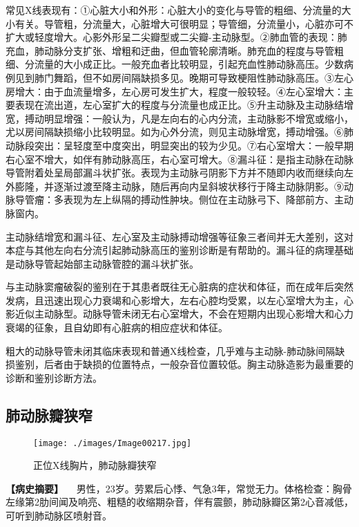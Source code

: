 常见X线表现有：①心脏大小和外形：心脏大小的变化与导管的粗细、分流量的大小有关。导管粗，分流量大，心脏增大可很明显；导管细，分流量小，心脏亦可不扩大或轻度增大。心影外形呈二尖瓣型或二尖瓣-主动脉型。②肺血管的表现：肺充血，肺动脉分支扩张、增粗和迂曲，但血管轮廓清晰。肺充血的程度与导管粗细、分流量的大小成正比。一般充血者比较明显，引起充血性肺动脉高压。少数病例见到肺门舞蹈，但不如房间隔缺损多见。晚期可导致梗阻性肺动脉高压。③左心房增大：由于血流量增多，左心房可发生扩大，程度一般较轻。④左心室增大：主要表现在流出道，左心室扩大的程度与分流量也成正比。⑤升主动脉及主动脉结增宽，搏动明显增强：一般认为，凡是左向右的心内分流，主动脉影不增宽或缩小，尤以房间隔缺损缩小比较明显。如为心外分流，则见主动脉增宽，搏动增强。⑥肺动脉段突出：呈轻度至中度突出，明显突出的较为少见。⑦右心室增大：一般早期右心室不增大，如伴有肺动脉高压，右心室可增大。⑧漏斗征：是指主动脉在动脉导管附着处呈局部漏斗状扩张。表现为主动脉弓阴影下方并不随即内收而继续向左外膨隆，并逐渐过渡至降主动脉，随后再向内呈斜坡状移行于降主动脉阴影。⑨动脉导管瘤：多表现为左上纵隔的搏动性肿块。侧位在主动脉弓下、降部前方、主动脉窗内。

主动脉结增宽和漏斗征、左心室及主动脉搏动增强等征象三者间并无大差别，这对本症与其他左向右分流引起肺动脉高压的鉴别诊断是有帮助的。漏斗征的病理基础是动脉导管起始部主动脉管腔的漏斗状扩张。

与主动脉窦瘤破裂的鉴别在于其患者既往无心脏病的症状和体征，而在成年后突然发病，且迅速出现心力衰竭和心影增大，左右心腔均受累，以左心室增大为主，心影近似主动脉型。动脉导管未闭无右心室增大，不会在短期内出现心影增大和心力衰竭的征象，且自幼即有心脏病的相应症状和体征。

粗大的动脉导管未闭其临床表现和普通X线检查，几乎难与主动脉-肺动脉间隔缺损鉴别，后者由于缺损的位置特点，一般杂音位置较低。胸主动脉造影为最重要的诊断和鉴别诊断方法。

\subsection{肺动脉瓣狭窄}

\begin{figure}[!htbp]
 \centering
 \texttt{[image: ./images/Image00217.jpg]}
 \captionsetup{justification=centering}
 \caption{正位X线胸片，肺动脉瓣狭窄}
 \label{fig4-2-4}
  \end{figure} 

\textbf{【病史摘要】}
　男性，23岁。劳累后心悸、气急3年，常觉无力。体格检查：胸骨左缘第2肋间闻及响亮、粗糙的收缩期杂音，伴有震颤，肺动脉瓣区第2心音减低，可听到肺动脉区喷射音。

